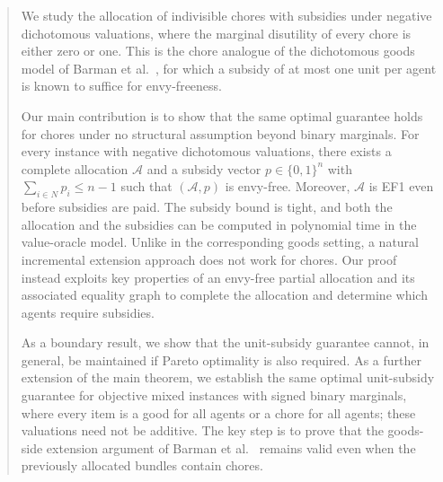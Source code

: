 \begin{abstract}
We study the allocation of indivisible chores with subsidies under negative dichotomous valuations, where the marginal disutility of every chore is either zero or one. This is the chore analogue of the dichotomous goods model of Barman et al.~\cite{BKNS22}, for which a subsidy of at most one unit per agent is known to suffice for envy-freeness.

Our main contribution is to show that the same optimal guarantee holds for chores under no structural assumption beyond binary marginals. For every instance with negative dichotomous valuations, there exists a complete allocation $\mathcal{A}$ and a subsidy vector $p\in\{0,1\}^n$ with $\sum_{i\in N} p_i\le n-1$ such that $(\mathcal{A},p)$ is envy-free. Moreover, $\mathcal{A}$ is EF1 even before subsidies are paid. The subsidy bound is tight, and both the allocation and the subsidies can be computed in polynomial time in the value-oracle model. Unlike in the corresponding goods setting, a natural incremental extension approach does not work for chores. Our proof instead exploits key properties of an envy-free partial allocation and its associated equality graph to complete the allocation and determine which agents require subsidies.

As a boundary result, we show that the unit-subsidy guarantee cannot, in general, be maintained if Pareto optimality is also required. As a further extension of the main theorem, we establish the same optimal unit-subsidy guarantee for objective mixed instances with signed binary marginals, where every item is a good for all agents or a chore for all agents; these valuations need not be additive. The key step is to prove that the goods-side extension argument of Barman et al.~\cite{BKNS22} remains valid even when the previously allocated bundles contain chores.
\end{abstract}

